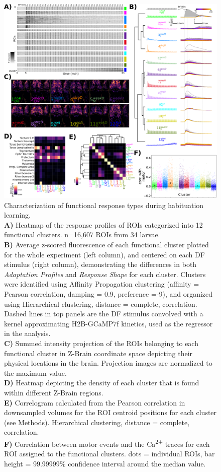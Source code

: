 \documentclass[9pt,lineno]{RandlettLab_elife}
\begin{document}
\begin{figure}
\begin{fullwidth}
\begin{center}
\includegraphics[width=0.95\linewidth]{Figure6 - Clustering.png}
\caption{
Characterization of functional response types during habituation learning. 
\\ \textbf{A)} Heatmap of the response profiles of ROIs categorized into 12 functional clusters. n=16,607 ROIs from 34 larvae. 
\\ \textbf{B)} Average z-scored fluorescence of each functional cluster plotted for the whole experiment (left column), and centered on each DF stimulus (right column), demonstrating the differences in both \emph{Adaptation Profiles} and \emph{Response Shape} for each cluster. Clusters were identified using Affinity Propagation clustering (affinity = Pearson correlation, damping = 0.9, preference =-9), and organized using Hierarchical clustering, distance = complete, correlation. Dashed lines in top panels are the DF stimulus convolved with a kernel approximating H2B-GCaMP7f kinetics, used as the regressor in the analysis. 
\\ \textbf{C)} Summed intensity projection of the ROIs belonging to each functional cluster in Z-Brain coordinate space depicting their physical locations in the brain. Projection images are normalized to the maximum value. 
\\ \textbf{D)} Heatmap depicting the density of each cluster that is found within different Z-Brain regions. 
\\ \textbf{E)} Correlogram calculated from the Pearson correlation in downsampled volumes for the ROI centroid positions for each cluster (see Methods). Hierarchical clustering, distance = complete, correlation. 
\\ \textbf{F)} Correlation between motor events and the Ca\textsuperscript{2+} traces for each ROI assigned to the functional clusters. dots = individual ROIs, bar height = 99.99999\% confidence interval around the median value. 
}
\label{fig:6}
\end{center}
\end{fullwidth}
\end{figure}
\end{document}
